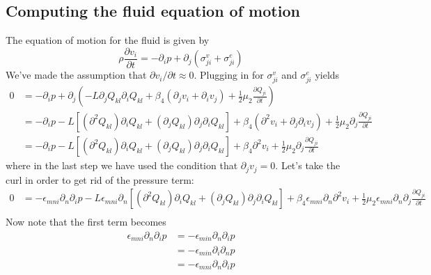 \documentclass[reqno]{article}
\begin{document}
	\subsection{Computing the fluid equation of motion}
	The equation of motion for the fluid is given by
	\begin{equation}
		\rho \frac{\partial v_i}{\partial t} = -\partial_i p + \partial_j (\sigma^v_{ji} + \sigma^{e}_{ji})
	\end{equation}
	We've made the assumption that $\partial v_i/\partial t \approx 0$. Plugging in for $\sigma^v_{ji}$ and $\sigma^e_{ji}$ yields
	\begin{equation}
	\begin{split}
		0 &= -\partial_i p + \partial_j \left( -L\partial_j Q_{kl} \partial_i Q_{kl} + \beta_4 (\partial_j v_i + \partial_i v_j) + \frac{1}{2} \mu_2  \frac{\partial Q_{ji}}{\partial t} \right) \\
		&= -\partial_i p - L\left[(\partial^2 Q_{kl}) \partial_i Q_{kl} + (\partial_j Q_{kl}) \partial_j \partial_i Q_{kl}\right] + \beta_4(\partial^2 v_i + \partial_j \partial_i v_j) + \frac{1}{2} \mu_2 \partial_j \frac{\partial Q_{ji}}{\partial t} \\
		&= -\partial_i p - L\left[(\partial^2 Q_{kl}) \partial_i Q_{kl} + (\partial_j Q_{kl}) \partial_j \partial_i Q_{kl}\right] + \beta_4\partial^2 v_i + \frac{1}{2} \mu_2 \partial_j \frac{\partial Q_{ji}}{\partial t}
	\end{split}
	\end{equation}
	where in the last step we have used the condition that $\partial_j v_j = 0$. Let's take the curl in order to get rid of the pressure term:
	\begin{equation}
	\begin{split}
		0 &= -\epsilon_{mni}\partial_n\partial_i p - L\epsilon_{mni}\partial_n\left[(\partial^2 Q_{kl}) \partial_i Q_{kl} + (\partial_j Q_{kl}) \partial_j \partial_i Q_{kl}\right] + \beta_4 \epsilon_{mni}\partial_n \partial^2 v_i + \frac{1}{2}\mu_2\epsilon_{mni}\partial_n \partial_j\frac{\partial Q_{ji}}{\partial t} \\
	\end{split}
	\end{equation}
	Now note that the first term becomes
	\begin{equation}
	\begin{split}
		\epsilon_{mni}\partial_n\partial_i p &= -\epsilon_{min}\partial_n\partial_i p \\
		&= -\epsilon_{min}\partial_i\partial_n p \\
		&= -\epsilon_{mni}\partial_n\partial_i p
	\end{split}
	\end{equation}
\end{document}
